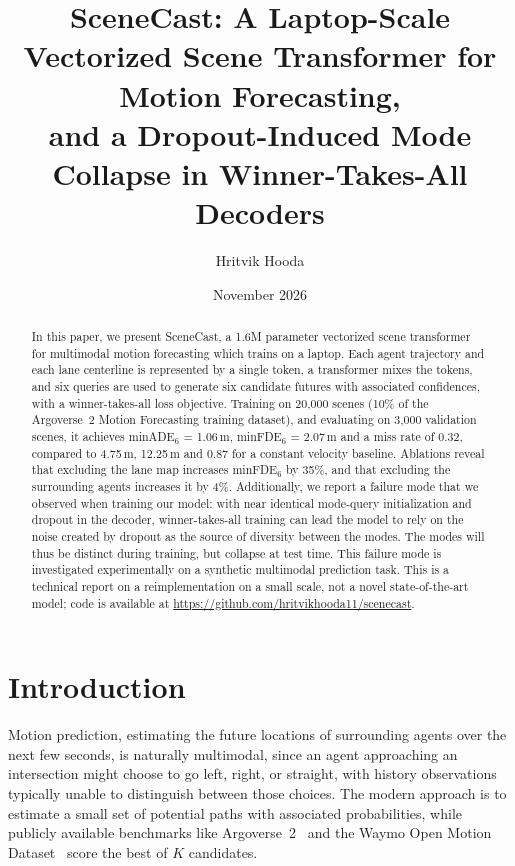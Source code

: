 \documentclass[10pt]{article}
\title{SceneCast: A Laptop-Scale Vectorized Scene Transformer for Motion Forecasting,\\
and a Dropout-Induced Mode Collapse in Winner-Takes-All Decoders}
\author{Hritvik Hooda}
\date{November 2026}
\begin{document}
\maketitle

\begin{abstract}
In this paper, we present SceneCast, a 1.6M parameter vectorized scene transformer for
multimodal motion forecasting which trains on a laptop. Each agent trajectory and each lane
centerline is represented by a single token, a transformer mixes the tokens, and six queries
are used to generate six candidate futures with associated confidences, with a
winner-takes-all loss objective. Training on 20{,}000 scenes (10\% of the Argoverse~2 Motion
Forecasting training dataset), and evaluating on 3{,}000 validation scenes, it achieves
minADE$_6$ = 1.06\,m, minFDE$_6$ = 2.07\,m and a miss rate of 0.32, compared to 4.75\,m,
12.25\,m and 0.87 for a constant velocity baseline. Ablations reveal that excluding the lane
map increases minFDE$_6$ by 35\%, and that excluding the surrounding agents increases it by
4\%. Additionally, we report a failure mode that we observed when training our model: with
near identical mode-query initialization and dropout in the decoder, winner-takes-all
training can lead the model to rely on the noise created by dropout as the source of
diversity between the modes. The modes will thus be distinct during training, but collapse
at test time. This failure mode is investigated experimentally on a synthetic multimodal
prediction task. This is a technical report on a reimplementation on a small scale, not a
novel state-of-the-art model; code is available at
\url{https://github.com/hritvikhooda11/scenecast}.
\end{abstract}

\section{Introduction}

Motion prediction, estimating the future locations of surrounding agents over the next few
seconds, is naturally multimodal, since an agent approaching an intersection might choose to
go left, right, or straight, with history observations typically unable to distinguish
between those choices. The modern approach is to estimate a small set of potential paths with
associated probabilities, while publicly available benchmarks like
Argoverse~2~\cite{wilson2021argoverse2} and the Waymo Open Motion
Dataset~\cite{ettinger2021womd} score the best of $K$ candidates.
\end{document}
